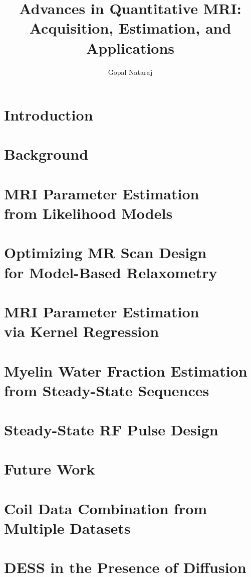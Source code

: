 \documentclass[thesis]{../cls/thesis-umich}
\title{
	Advances in Quantitative MRI: \\
	Acquisition,
	Estimation,
	and 
	Applications
}
\author{Gopal Nataraj}
\begin{document}
\chapter{Introduction}
\label{c,intro}


\chapter{Background}
\label{c,bkgrd}


\chapter{MRI Parameter Estimation\,\\ from Likelihood Models}
\label{c,relax}


\chapter{Optimizing MR Scan Design\,\\ for Model-Based Relaxometry}
\label{c,scn-dsgn}


\chapter{MRI Parameter Estimation\,\\ via Kernel Regression}
\label{c,krr}


\chapter{Myelin Water Fraction Estimation\,\\ from Steady-State Sequences}
\label{c,mwf}


\chapter{Steady-State RF Pulse Design}
\label{c,ss-rf}


\chapter{Future Work}
\label{c,future}


\appendix
\chapter{Coil Data Combination from Multiple Datasets}
\label{a,cc-multi}


\chapter{DESS in the Presence of Diffusion}
\label{a,dess-diff}




\end{document}
